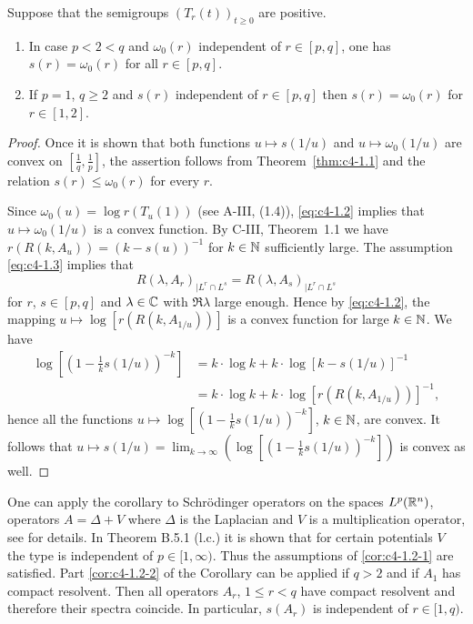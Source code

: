 \begin{corollary}\label{cor:c4-1.2}
Suppose that the semigroups $(T_{r}(t))_{t\geq 0}$ are positive.
\begin{enumerate}[\upshape(i)]
\item \label{cor:c4-1.2-1}
In case $p < 2 < q$ and $\omega_{0}(r)$ independent of $r \in [p,q]$, one has $s(r) = \omega_{0}(r)$ for all $r \in [p,q]$.
\item \label{cor:c4-1.2-2}
If $p = 1$, $q \geq 2$ and $s(r)$ independent of $r \in [p,q]$ then $s(r) = \omega_{0}(r)$ for $r \in [1,2]$.
\end{enumerate}
\end{corollary}
\begin{proof}
Once it is shown that both functions $u \mapsto s(1/u)$ and $u \mapsto \omega_{0}(1/u)$ are convex on $[\frac{1}{q},\frac{1}{p}]$, the assertion follows from  Theorem~\ref{thm:c4-1.1} and the relation $s(r) \leq \omega_{0}(r)$ for every $r$.

Since $\omega_{0}(u) = \log r(T_{u}(1))$ (see A-III, (1.4)), \eqref{eq:c4-1.2} implies that $u \mapsto \omega_0(1/u)$ is a convex function.
By C-III, Theorem~1.1 we have $r(R(k,A_{u})) = (k-s(u))^{-1}$ for $k \in \mathbb{N}$ sufficiently large.
The assumption \eqref{eq:c4-1.3} implies that 
\[
R(\lambda,A_{r})_{|L^{r} \cap L^{s}} = R(\lambda,A_{s})_{|L^{r} \cap L^{s}}
\]
for $r$, $s \in [p,q]$ and $\lambda \in \mathbb{C}$ with $\Re \lambda$ large enough.
Hence by \eqref{eq:c4-1.2}, the mapping  $u \mapsto \log [r(R(k,A_{1/u}))]$ is a convex function for large $k \in \mathbb{N}$.
We have
\begin{align*}
\log  \left[(1 - \frac{1}{k}s(1/u))^{-k}\right] &= k \cdot \log k + k \cdot \log [k - s(1/u)]^{-1} \\
&= k \cdot \log k + k \cdot \log [r(R(k,A_{1/u}))]^{-1},
\end{align*}
hence all the functions $u \mapsto \log[(1 - \frac{1}{k}s(1/u))^{-k}]$, $k \in \mathbb{N}$, are convex.
It follows that $u \mapsto s(1/u) = \lim_{k\to\infty}(\log [(1 - \frac{1}{k}s(1/u))^{-k}])$ is convex as well.
\end{proof}
One can apply the corollary to Schrödinger operators on the spaces $L^{p}(\mathbb{R}^{n})$, \ie operators $A = \Delta + V$ where $\Delta$ is the Laplacian and $V$ is a multiplication operator, see  \citet{simon:1982} for details.
In Theorem B.5.1 (l.c.) it is shown that for certain potentials $V$ the type is independent of $p \in [1,\infty)$.
Thus the assumptions of \ref{cor:c4-1.2-1} are satisfied.
Part \ref{cor:c4-1.2-2} of the Corollary can be applied if $q > 2$ and if $A_{1}$ has compact resolvent.
Then all operators $A_{r}$, $1 \leq r < q$ have compact resolvent and therefore their spectra coincide.
In particular, $s(A_{r})$ is independent of $r \in [1,q)$.

